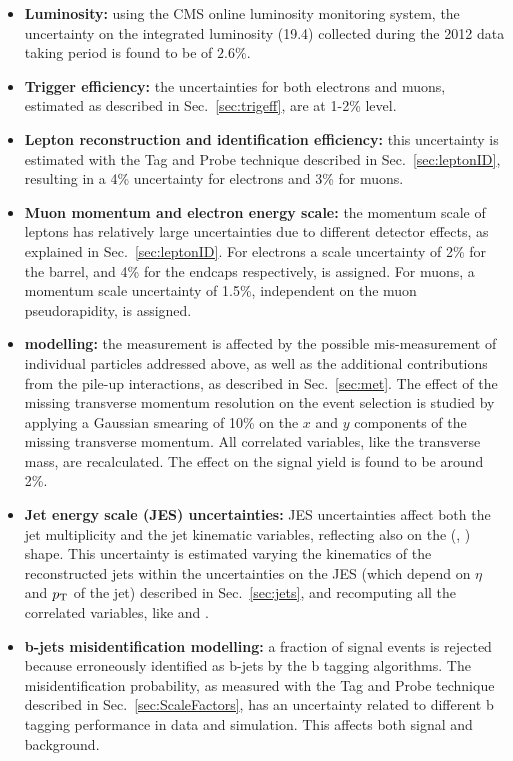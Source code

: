 \begin{itemize}
\item {\bf Luminosity:} using the CMS online luminosity monitoring system, the uncertainty on the integrated luminosity (19.4\ifb) collected during the 2012 data taking period is found to be of $2.6\%$.

\item {\bf Trigger efficiency:} the uncertainties for both electrons and muons, estimated as described in Sec.~\ref{sec:trigeff}, are at 1-2\% level.

\item {\bf Lepton reconstruction and identification efficiency:} 
this uncertainty is estimated with the Tag and Probe technique described in Sec.~\ref{sec:leptonID}, resulting in a 4\% uncertainty for electrons and 3\% for muons.

\item {\bf Muon momentum and electron energy scale:} 
the momentum scale of leptons has relatively large uncertainties due to different detector effects, as explained in Sec.~\ref{sec:leptonID}. For electrons a scale  uncertainty of 2\% for the barrel, and 4\% for the endcaps respectively, is assigned. For muons, a momentum scale uncertainty of 1.5\%, independent on the muon pseudorapidity, is assigned.

\item {\bf {\boldmath \MET} modelling:} 
  the \MET measurement is affected by the possible mis-measurement of 
  individual particles addressed above, as well as the additional contributions 
  from the pile-up interactions, as described in Sec.~\ref{sec:met}. 
  The effect of the missing transverse momentum resolution on the event selection
  is studied by applying a Gaussian smearing of 10\% on the $x$ and
  $y$ components of the missing transverse momentum. All correlated variables,
  like the transverse mass, are recalculated. The effect on the signal yield is found to be around 2\%.

\item {\bf Jet energy scale (JES) uncertainties:} 
  JES uncertainties affect both the jet multiplicity and the jet kinematic variables, reflecting also on the (\mll, \mt) shape.
  This uncertainty is estimated varying the kinematics of the reconstructed jets within the uncertainties on the JES (which depend on $\eta$ and $p_\mathrm{T}$ of the jet) described in Sec.~\ref{sec:jets}, and recomputing all the correlated variables, like \mll and \mt.

\item {\bf b-jets misidentification modelling:}
a fraction of signal events is rejected because erroneously identified as b-jets by the b tagging algorithms. The misidentification probability, as measured with the Tag and Probe technique described in Sec.~\ref{sec:ScaleFactors}, has an uncertainty related to different b tagging performance in data and simulation. This affects both signal and background.
          

\end{itemize}
